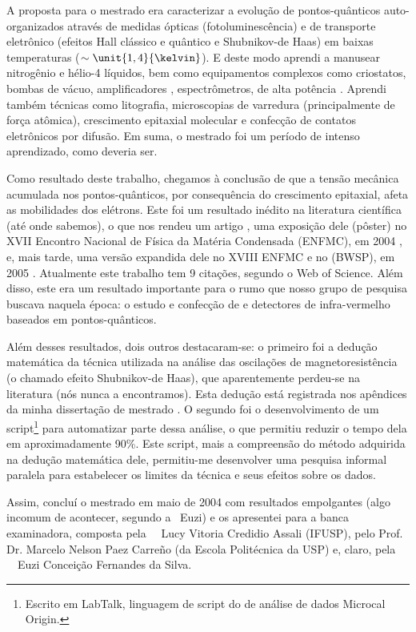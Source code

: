 A proposta para o mestrado era caracterizar a evolução de pontos-quânticos auto-organizados através de medidas ópticas (fotoluminescência) e de transporte eletrônico (efeitos Hall clássico e quântico e Shubnikov-de Haas) em baixas temperaturas ($\sim\unit{1,4}{\kelvin}$). E deste modo aprendi a manusear nitrogênio e hélio-4 líquidos, bem como equipamentos complexos como criostatos, bombas de vácuo, amplificadores , espectrômetros,  de alta potência \etc. Aprendi também técnicas como litografia, microscopias de varredura (principalmente de força atômica), crescimento epitaxial molecular e confecção de contatos eletrônicos por difusão. Em suma, o mestrado foi um período de intenso aprendizado, como deveria ser.

Como resultado deste trabalho, chegamos à conclusão de que a tensão mecânica acumulada nos pontos-quânticos, por consequência do crescimento epitaxial, afeta as mobilidades dos elétrons. Este foi um resultado inédito na literatura científica (até onde sabemos), o que nos rendeu um artigo \cite{pagnossin-2005-1}, uma exposição dele (pôster) no XVII Encontro Nacional de Física da Matéria Condensada (ENFMC), em 2004 \cite{pagnossin-2004-2}, e, mais tarde, uma versão expandida dele no XVIII ENFMC e no  (BWSP), em 2005 \cite{pagnossin-2005-2, pagnossin-2005-3}. Atualmente este trabalho tem 9 citações, segundo o Web of Science. Além disso, este era um resultado importante para o rumo que nosso grupo de pesquisa buscava naquela época: o estudo e confecção de  e detectores de infra-vermelho baseados em pontos-quânticos.

Além desses resultados, dois outros destacaram-se: o primeiro foi a dedução matemática da técnica utilizada na análise das oscilações de magnetoresistência (o chamado efeito Shubnikov-de Haas), que aparentemente perdeu-se na literatura (nós nunca a encontramos). Esta dedução está registrada nos apêndices da minha dissertação de mestrado \cite{pagnossin-2004-1}. O segundo foi o desenvolvimento de um script\footnote{Escrito em LabTalk, linguagem de script do  de análise de dados Microcal Origin.} para automatizar parte dessa análise, o que permitiu reduzir o tempo dela em aproximadamente 90\%. Este script, mais a compreensão do método adquirida na dedução matemática dele, permitiu-me desenvolver uma pesquisa informal paralela para estabelecer os limites da técnica e seus efeitos sobre os dados.

Assim, concluí o mestrado em maio de 2004 com resultados empolgantes (algo incomum de acontecer, segundo a \profa\ Euzi) e os apresentei para a banca examinadora, composta pela \profa\ \dra\ Lucy Vitoria Credidio Assali (IFUSP), pelo Prof. Dr. Marcelo Nelson Paez Carreño (da Escola Politécnica da USP) e, claro, pela \profa\ \dra\ Euzi Conceição Fernandes da Silva.

